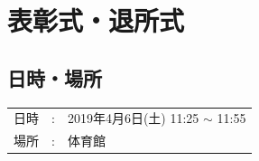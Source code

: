%

\section{表彰式・退所式}

\subsection{日時・場所}
\begin{tabular}{p{}rp{}}
  日時 & : & 2019年4月6日(土) 11:25 $\sim$ 11:55\\
  場所 & : & 体育館
\end{tabular}

